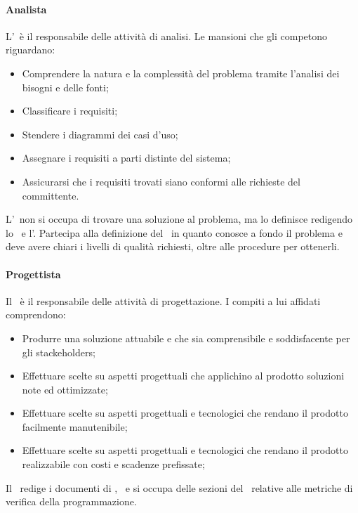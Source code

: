 \documentclass[../NormeProgetto.tex]{subfiles}
\begin{document}
			\paragraph{Analista}
			L'\analista\ è il responsabile delle attività di analisi. Le mansioni che gli competono riguardano:
			\begin{itemize}
			\item Comprendere la natura e la complessità del problema tramite l'analisi dei bisogni e delle fonti;
			\item Classificare i requisiti;
			\item Stendere i diagrammi dei casi d'uso;
			\item Assegnare i requisiti a parti distinte del sistema;
			\item Assicurarsi che i requisiti trovati siano conformi alle richieste del committente.
			\end{itemize}
			L'\analista\ non si occupa di trovare una soluzione al problema, ma lo definisce redigendo lo \studiodifattibilita\ e l'\analisideirequisiti. Partecipa alla definizione del \pianodiqualifica\ in quanto conosce a fondo il problema e deve avere chiari i livelli di qualità richiesti, oltre alle procedure per ottenerli. 
			\paragraph{Progettista}
			Il \progettista\ è il responsabile delle attività di progettazione. I compiti a lui affidati comprendono:
			\begin{itemize}
			\item Produrre una soluzione attuabile e che sia comprensibile e soddisfacente per gli stackeholders;
			\item Effettuare scelte su aspetti progettuali che applichino al prodotto soluzioni note ed ottimizzate;
			\item Effettuare scelte su aspetti progettuali e tecnologici che rendano il prodotto facilmente manutenibile;
			\item Effettuare scelte su aspetti progettuali e tecnologici che rendano il prodotto realizzabile con costi e scadenze prefissate;
			\end{itemize}
			Il \progettista\ redige i documenti di \specificatecnica, \ e si occupa delle sezioni del \pianodiqualifica\ relative alle metriche di verifica della programmazione.
\end{document}
